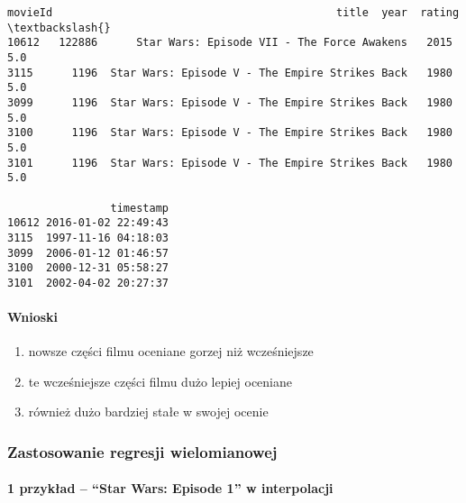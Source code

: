 \documentclass[11pt]{article}
\makeatletter
\providecommand{\tightlist}{%
      \setlength{\itemsep}{0pt}\setlength{\parskip}{0pt}}
\newcommand{\boxspacing}{\kern\kvtcb@left@rule\kern\kvtcb@boxsep}
\newcommand{\prompt}[4]{
        {\ttfamily\llap{{\color{#2}[#3]:\hspace{3pt}#4}}\vspace{-\baselineskip}}
    }
\makeatother
\begin{document}
            \begin{tcolorbox}[breakable, size=fbox, boxrule=.5pt, pad at break*=1mm, opacityfill=0]
\prompt{Out}{outcolor}{65}{\boxspacing}
\begin{Verbatim}[commandchars=\\\{\}]
       movieId                                            title  year  rating  \textbackslash{}
10612   122886      Star Wars: Episode VII - The Force Awakens   2015     5.0
3115      1196  Star Wars: Episode V - The Empire Strikes Back   1980     5.0
3099      1196  Star Wars: Episode V - The Empire Strikes Back   1980     5.0
3100      1196  Star Wars: Episode V - The Empire Strikes Back   1980     5.0
3101      1196  Star Wars: Episode V - The Empire Strikes Back   1980     5.0

                timestamp
10612 2016-01-02 22:49:43
3115  1997-11-16 04:18:03
3099  2006-01-12 01:46:57
3100  2000-12-31 05:58:27
3101  2002-04-02 20:27:37
\end{Verbatim}
\end{tcolorbox}
        
    \hypertarget{wnioski}{%
\paragraph{Wnioski}\label{wnioski}}

\begin{enumerate}
\def\labelenumi{\arabic{enumi}.}
\tightlist
\item
  nowsze części filmu oceniane gorzej niż wcześniejsze
\item
  te wcześniejsze części filmu dużo lepiej oceniane
\item
  również dużo bardziej stałe w swojej ocenie
\end{enumerate}

    \hypertarget{zastosowanie-regresji-wielomianowej}{%
\subsubsection{Zastosowanie regresji
wielomianowej}\label{zastosowanie-regresji-wielomianowej}}

\hypertarget{przykux142ad-star-wars-episode-1-w-interpolacji}{%
\paragraph{1 przykład -- ``Star Wars: Episode 1'' w
interpolacji}\label{przykux142ad-star-wars-episode-1-w-interpolacji}}
\end{document}
